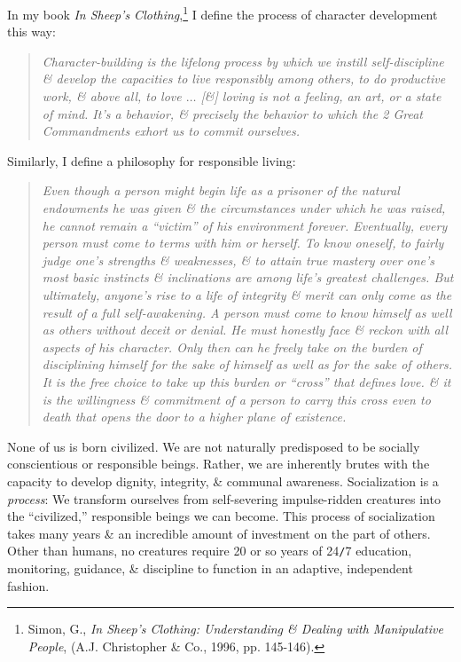 \documentclass{article}
\numberwithin{equation}{section}
\begin{document}
In my book \textit{In Sheep's Clothing},\footnote{Simon, G., \textit{In Sheep's Clothing: Understanding \& Dealing with Manipulative People}, (A.J. Christopher \& Co., 1996, pp. 145-146).} I define the process of character development this way:
\begin{quotation}\it
	Character-building is the lifelong process by which we instill self-discipline \& develop the capacities to live responsibly among others, to do productive work, \& above all, to love $\ldots$ [\&] loving is not a feeling, an art, or a state of mind. It's a behavior, \& precisely the behavior to which the 2 Great Commandments exhort us to commit ourselves.
\end{quotation}
Similarly, I define a philosophy for responsible living:
\begin{quotation}\it
	Even though a person might begin life as a prisoner of the natural endowments he was given \& the circumstances under which he was raised, he cannot remain a ``victim'' of his environment forever. Eventually, every person must come to terms with him or herself. To know oneself, to fairly judge one's strengths \& weaknesses, \& to attain true mastery over one's most basic instincts \& inclinations are among life's greatest challenges. But ultimately, anyone's rise to a life of integrity \& merit can only come as the result of a full self-awakening. A person must come to know himself as well as others without deceit or denial. He must honestly face \& reckon with all aspects of his character. Only then can he freely take on the burden of disciplining himself for the sake of himself as well as for the sake of others. It is the free choice to take up this burden or ``cross'' that defines love. \& it is the willingness \& commitment of a person to carry this cross even to death that opens the door to a higher plane of existence.
\end{quotation}
None of us is born civilized. We are not naturally predisposed to be socially conscientious or responsible beings. Rather, we are inherently brutes with the capacity to develop dignity, integrity, \& communal awareness. Socialization is a \textit{process}: We transform ourselves from self-severing impulse-ridden creatures into the ``civilized,'' responsible beings we can become. This process of socialization takes many years \& an incredible amount of investment on the part of others. Other than humans, no creatures require 20 or so years of 24\texttt{/}7 education, monitoring, guidance, \& discipline to function in an adaptive, independent fashion.
\end{document}
